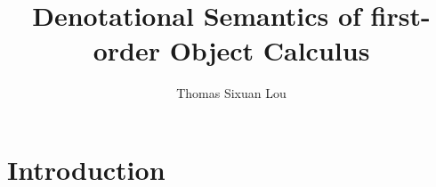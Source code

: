 \documentclass{article}
\begin{document}
\title{Denotational Semantics of first-order Object Calculus}
\author{Thomas Sixuan Lou}
\maketitle

\section{Introduction}


% 
\end{document}
